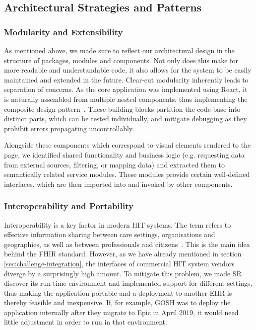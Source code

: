 \documentclass[sigconf]{acmart}
\begin{document}
\subsection{Architectural Strategies and Patterns}
\label{sec:strategies-patterns}


\subsubsection{Modularity and Extensibility}
\label{sec:modularity}

As mentioned above, we made sure to reflect our architectural design in the structure of packages, modules and components. Not only does this make for more readable and understandable code, it also allows for the system to be easily maintained and extended in the future. %
Clear-cut modularity inherently leads to separation of concerns. As the core application was implemented using React, it is naturally assembled from multiple nested components, thus implementing the composite design pattern~\cite{design-patterns}. These building blocks partition the code-base into distinct parts, which can be tested individually, and mitigate debugging as they prohibit errors propagating uncontrollably.

Alongside these components which correspond to visual elements rendered to the page, we identified shared functionality and business logic (e.g. requesting data from external sources, filtering, or mapping data) and extracted them to semantically related service modules. These modules provide certain well-defined interfaces, which are then imported into and invoked by other components.


\subsubsection{Interoperability and Portability}
\label{sec:interoperability}

Interoperability is a key factor in modern HIT systems. The term refers to effective information sharing between care settings, organisations and geographies, as well as between professionals and citizens~\cite{nhs-interoperability}. This is the main idea behind the FHIR standard. However, as we have already mentioned in section \ref{sec:challenge-integration}, the interfaces of commercial HIT system vendors diverge by a surprisingly high amount. 
%
To mitigate this problem, we made SR discover its run-time environment and implemented support for different settings, thus making the application portable and a deployment to another EHR is thereby feasible and inexpensive. If, for example, GOSH was to deploy the application internally after they migrate to Epic in April 2019, %
it would need little adjustment in order to run in that environment.
\end{document}
